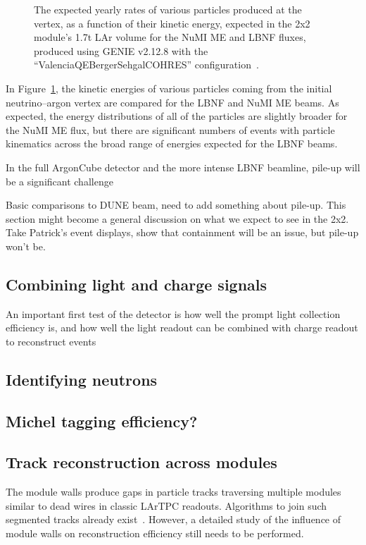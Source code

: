 \begin{figure}[htb]
  \caption{The expected yearly rates of various particles produced at the vertex, as a function of their kinetic energy, expected in the 2x2 module's 1.7t LAr volume for the NuMI ME and LBNF fluxes, produced using GENIE v2.12.8 with the ``ValenciaQEBergerSehgalCOHRES'' configuration~\cite{genie}. }
  \label{fig:kinetic_energies}
\end{figure}
In Figure~\ref{fig:kinetic_energies}, the kinetic energies of various particles coming from the initial neutrino--argon vertex are compared for the LBNF and NuMI ME beams. As expected, the energy distributions of all of the particles are slightly broader for the NuMI ME flux, but there are significant numbers of events with particle kinematics across the broad range of energies expected for the LBNF beams.

In the full ArgonCube detector and the more intense LBNF beamline, pile-up will be a significant challenge



Basic comparisons to DUNE beam, need to add something about pile-up. This section might become a general discussion on what we expect to see in the 2x2. Take Patrick's event displays, show that containment will be an issue, but pile-up won't be.

\FloatBarrier
\subsection{Combining light and charge signals}
An important first test of the detector is how well the prompt light collection efficiency is, and how well the light readout can be combined with charge readout to reconstruct events

\subsection{Identifying neutrons}

\subsection{Michel tagging efficiency?}

\subsection{Track reconstruction across modules}
  The module walls produce gaps in particle tracks traversing multiple modules similar to dead wires in classic LArTPC readouts.
Algorithms to join such segmented tracks already exist~\cite{pandora}.
However, a detailed study of the influence of module walls on reconstruction efficiency still needs to be performed.

